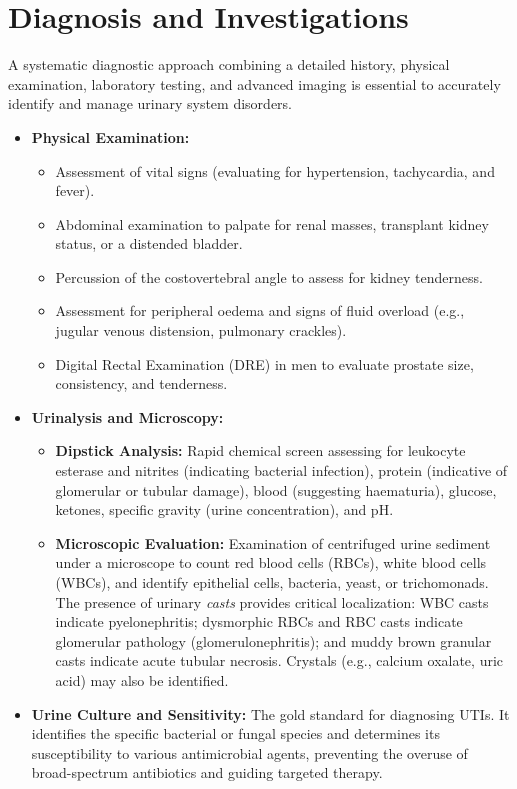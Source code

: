 \section*{Diagnosis and Investigations}
A systematic diagnostic approach combining a detailed history, physical examination, laboratory testing, and advanced imaging is essential to accurately identify and manage urinary system disorders.

\begin{itemize}
    \item \textbf{Physical Examination:}
    \begin{itemize}
        \item Assessment of vital signs (evaluating for hypertension, tachycardia, and fever).
        \item Abdominal examination to palpate for renal masses, transplant kidney status, or a distended bladder.
        \item Percussion of the costovertebral angle to assess for kidney tenderness.
        \item Assessment for peripheral oedema and signs of fluid overload (e.g., jugular venous distension, pulmonary crackles).
        \item Digital Rectal Examination (DRE) in men to evaluate prostate size, consistency, and tenderness.
    \end{itemize}
    \item \textbf{Urinalysis and Microscopy:}
    \begin{itemize}
        \item \textbf{Dipstick Analysis:} Rapid chemical screen assessing for leukocyte esterase and nitrites (indicating bacterial infection), protein (indicative of glomerular or tubular damage), blood (suggesting haematuria), glucose, ketones, specific gravity (urine concentration), and pH.
        \item \textbf{Microscopic Evaluation:} Examination of centrifuged urine sediment under a microscope to count red blood cells (RBCs), white blood cells (WBCs), and identify epithelial cells, bacteria, yeast, or trichomonads. The presence of urinary \textit{casts} provides critical localization: WBC casts indicate pyelonephritis; dysmorphic RBCs and RBC casts indicate glomerular pathology (glomerulonephritis); and muddy brown granular casts indicate acute tubular necrosis. Crystals (e.g., calcium oxalate, uric acid) may also be identified.
    \end{itemize}
    \item \textbf{Urine Culture and Sensitivity:} The gold standard for diagnosing UTIs. It identifies the specific bacterial or fungal species and determines its susceptibility to various antimicrobial agents, preventing the overuse of broad-spectrum antibiotics and guiding targeted therapy.

\end{itemize}
